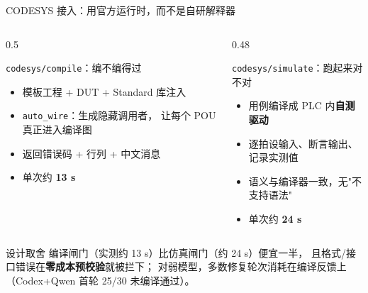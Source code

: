 \documentclass[10pt,aspectratio=169]{beamer}
\begin{document}
\begin{frame}{CODESYS 接入：用官方运行时，而不是自研解释器}
	\begin{columns}[T]
		\begin{column}{0.5\textwidth}
			\begin{block}{\texttt{codesys/compile}：编不编得过}
				\begin{itemize}
					\item 模板工程 + DUT + Standard 库注入
					\item \texttt{auto\_wire}：生成隐藏调用者，
					      让每个 POU 真正进入编译图
					\item 返回错误码 + 行列 + 中文消息
					\item 单次约 \textbf{13 s}
				\end{itemize}
			\end{block}
		\end{column}
		\begin{column}{0.48\textwidth}
			\begin{block}{\texttt{codesys/simulate}：跑起来对不对}
				\begin{itemize}
					\item 用例编译成 PLC 内\textbf{自测驱动}
					\item 逐拍设输入、断言输出、记录实测值
					\item 语义与编译器一致，无"不支持语法"
					\item 单次约 \textbf{24 s}
				\end{itemize}
			\end{block}
		\end{column}
	\end{columns}
	\vspace{0.4em}
	\begin{alertblock}{设计取舍}
		编译闸门（实测约 13 s）比仿真闸门（约 24 s）便宜一半，
		且格式/接口错误在\textbf{零成本预校验}就被拦下；
		对弱模型，多数修复轮次消耗在编译反馈上
		（Codex+Qwen 首轮 25/30 未编译通过）。
	\end{alertblock}
\end{frame}
\end{document}
